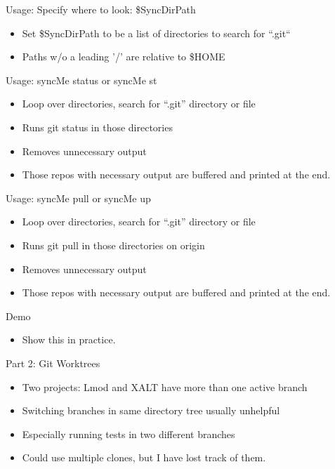 \documentclass{beamer}
\begin{document}
\begin{frame}{Usage: Specify where to look: \$SyncDirPath}
  \begin{itemize}
    \item Set \$SyncDirPath to be a list of directories to search for
      ``.git``
    \item Paths w/o a leading '/' are relative to \$HOME
  \end{itemize}
\end{frame}

\begin{frame}{Usage: syncMe status or syncMe st}
  \begin{itemize}
    \item Loop over directories, search for ``.git'' directory or file
    \item Runs {\color{red} git status} in those directories
    \item Removes unnecessary output
    \item Those repos with necessary output are buffered and printed
      at the end.
  \end{itemize}
\end{frame}

\begin{frame}{Usage: syncMe pull or syncMe up}
  \begin{itemize}
    \item Loop over directories, search for ``.git'' directory or file
    \item Runs {\color{red} git pull} in those directories on origin
    \item Removes unnecessary output
    \item Those repos with necessary output are buffered and printed
      at the end.
  \end{itemize}
\end{frame}


\begin{frame}{Demo}
  \begin{itemize}
    \item Show this in practice.
  \end{itemize}
\end{frame}

\begin{frame}{Part 2: Git Worktrees}
  \begin{itemize}
    \item Two projects: Lmod and XALT have more than one active branch
    \item Switching branches in same directory tree usually unhelpful
    \item Especially running tests in two different branches
    \item Could use multiple clones, but I have lost track of them.
  \end{itemize}
\end{frame}
\end{document}
